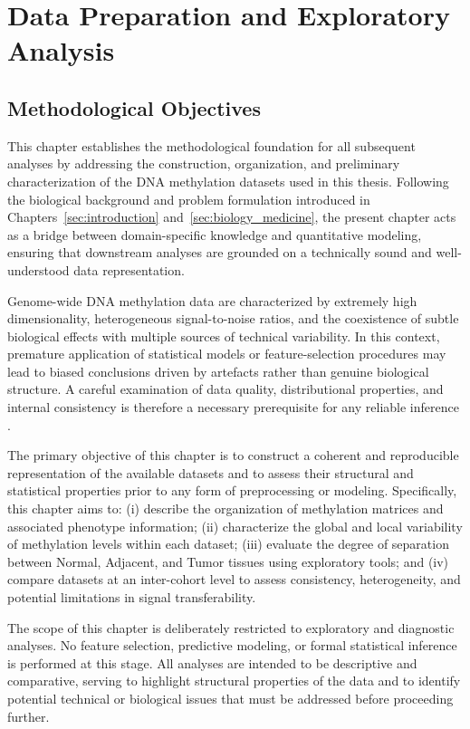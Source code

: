 \chapter{Data Preparation and Exploratory Analysis}
\label{sec:data_preparation_exploration}

\section{Methodological Objectives}
\label{sec:methodological_objectives}

This chapter establishes the methodological foundation for all subsequent analyses by addressing the construction, organization, and preliminary characterization of the DNA methylation datasets used in this thesis. Following the biological background and problem formulation introduced in Chapters~\ref{sec:introduction} and~\ref{sec:biology_medicine}, the present chapter acts as a bridge between domain-specific knowledge and quantitative modeling, ensuring that downstream analyses are grounded on a technically sound and well-understood data representation.

Genome-wide DNA methylation data are characterized by extremely high dimensionality, heterogeneous signal-to-noise ratios, and the coexistence of subtle biological effects with multiple sources of technical variability. In this context, premature application of statistical models or feature-selection procedures may lead to biased conclusions driven by artefacts rather than genuine biological structure. A careful examination of data quality, distributional properties, and internal consistency is therefore a necessary prerequisite for any reliable inference \cite{Yousefi2013}.

The primary objective of this chapter is to construct a coherent and reproducible representation of the available datasets and to assess their structural and statistical properties prior to any form of preprocessing or modeling. Specifically, this chapter aims to: (i) describe the organization of methylation matrices and associated phenotype information; (ii) characterize the global and local variability of methylation levels within each dataset; (iii) evaluate the degree of separation between Normal, Adjacent, and Tumor tissues using exploratory tools; and (iv) compare datasets at an inter-cohort level to assess consistency, heterogeneity, and potential limitations in signal transferability.

The scope of this chapter is deliberately restricted to exploratory and diagnostic analyses. No feature selection, predictive modeling, or formal statistical inference is performed at this stage. All analyses are intended to be descriptive and comparative, serving to highlight structural properties of the data and to identify potential technical or biological issues that must be addressed before proceeding further.

